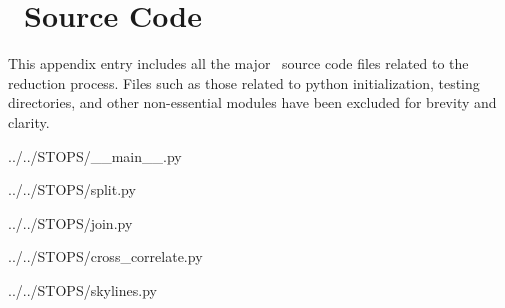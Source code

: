 \chapter{\stops\ Source Code} \label{app:code}

This appendix entry includes all the major \stops\ source code files related to the reduction process. Files such as those related to python initialization, testing directories, and other non-essential modules have been excluded for brevity and clarity.
\prgph



{../../STOPS/__main__.py}
\clearpage


{../../STOPS/split.py}
\clearpage


{../../STOPS/join.py}
\clearpage


{../../STOPS/cross_correlate.py}
\clearpage


{../../STOPS/skylines.py}
